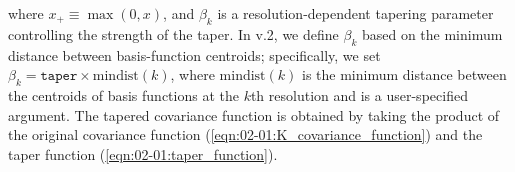 \documentclass[nojss]{jss}
\def\mbf#1{{%
\mathchoice%
{\hbox{\boldmath$\displaystyle{#1}$}}%
{\hbox{\boldmath$\textstyle{#1}$}}%
{\hbox{\boldmath$\scriptstyle{#1}$}}%
{\hbox{\boldmath$\scriptscriptstyle{#1}$}}%
}}
\def\vec{\mbf}
\begin{document}
\begin{appendix}
\begin{equation}
\end{equation}
where $x_{+} \equiv \max(0, x)$, and $\beta_k$ is a resolution-dependent tapering parameter controlling the strength of the taper. 
In  v.2, we define $\beta_k$ based on the minimum distance between basis-function centroids; specifically, we set $\beta_k = \texttt{taper} \times \text{mindist}(k)$, where $\text{mindist}(k)$ is the minimum distance between the centroids of basis functions at the $k$th resolution and  is a user-specified argument.
The tapered covariance function is obtained by taking the product of the original covariance function (\ref{eqn:02-01:K_covariance_function}) and the taper function (\ref{eqn:02-01:taper_function}).%




\end{appendix}
\end{document}
